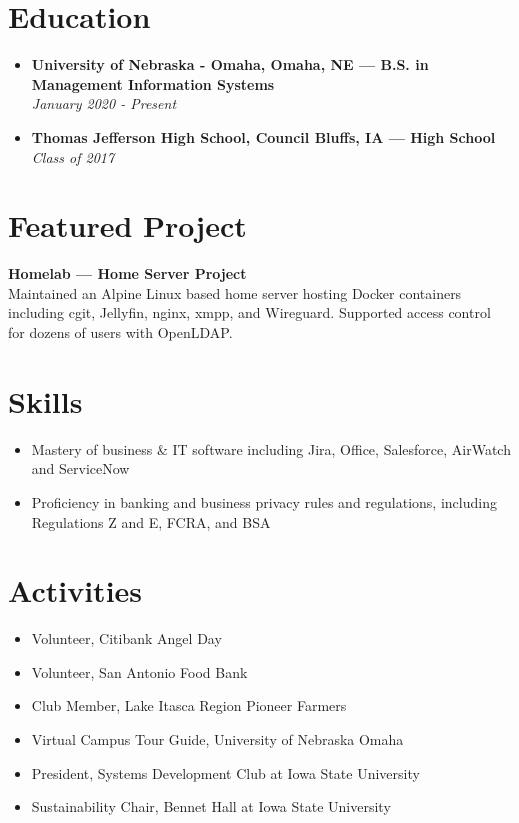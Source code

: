 \documentclass[letterpaper,9pt]{article}
\begin{document}
\section*{Education}
\begin{itemize}
\item[] \textbf{University of Nebraska - Omaha, Omaha, NE — B.S. in Management Information Systems} \\
\textit{January 2020 - Present}

\item[] \textbf{Thomas Jefferson High School, Council Bluffs, IA — High School} \\
\textit{Class of 2017}
\end{itemize}

\section*{Featured Project}
\textbf{Homelab — Home Server Project} \\
Maintained an Alpine Linux based home server hosting Docker containers including cgit, Jellyfin, nginx, xmpp, and Wireguard. Supported access control for dozens of users with OpenLDAP.

\section*{Skills}
\begin{itemize}
    \item Mastery of business \& IT software including Jira, Office, Salesforce, AirWatch and ServiceNow
    \item Proficiency in banking and business privacy rules and regulations, including Regulations Z and E, FCRA, and BSA
\end{itemize}

\section*{Activities}
\begin{itemize}
    \item Volunteer, Citibank Angel Day
    \item Volunteer, San Antonio Food Bank
    \item Club Member, Lake Itasca Region Pioneer Farmers
    \item Virtual Campus Tour Guide, University of Nebraska Omaha
    \item President, Systems Development Club at Iowa State University
    \item Sustainability Chair, Bennet Hall at Iowa State University
\end{itemize}
\end{document}
